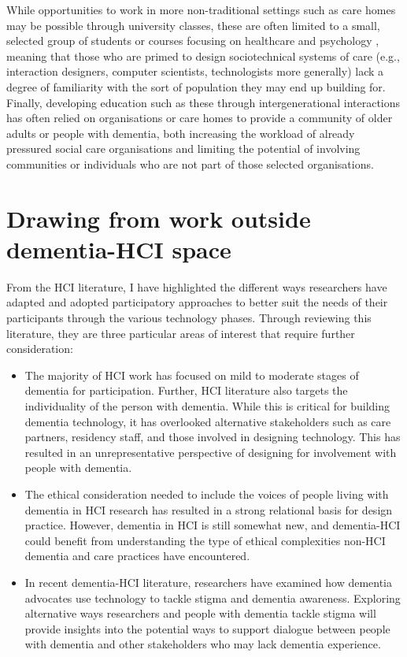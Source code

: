 While opportunities to work in more non-traditional settings such as care homes may be possible through university classes, these are often limited to a small, selected group of students or courses focusing on healthcare and psychology \citep{kinnunen_understanding_2018}, meaning that those who are primed to design sociotechnical systems of care (e.g., interaction designers, computer scientists, technologists more generally) lack a degree of familiarity with the sort of population they may end up building for. Finally, developing education such as these through intergenerational interactions has often relied on organisations or care homes to provide a community of older adults or people with dementia, both increasing the workload of already pressured social care organisations and limiting the potential of involving communities or individuals who are not part of those selected organisations. 

\section{Drawing from work outside dementia-HCI space}
\label{BL:Outside-HCI}
From the HCI literature, I have highlighted the different ways researchers have adapted and adopted participatory approaches to better suit the needs of their participants through the various technology phases. Through reviewing this literature, they are three particular areas of interest that require further consideration:
\begin{itemize}
    \item The majority of HCI work has focused on mild to moderate stages of dementia for participation. Further, HCI literature also targets the individuality of the person with dementia. While this is critical for building dementia technology, it has overlooked alternative stakeholders such as care partners, residency staff, and those involved in designing technology. This has resulted in an unrepresentative perspective of designing for involvement with people with dementia. 
    
    \item The ethical consideration needed to include the voices of people living with dementia in HCI research has resulted in a strong relational basis for design practice. However, dementia in HCI is still somewhat new, and dementia-HCI could benefit from understanding the type of ethical complexities non-HCI dementia and care practices have encountered.
    
    \item In recent dementia-HCI literature, researchers have examined how dementia advocates use technology to tackle stigma and dementia awareness. Exploring alternative ways researchers and people with dementia tackle stigma will provide insights into the potential ways to support dialogue between people with dementia and other stakeholders who may lack dementia experience.
\end{itemize}

